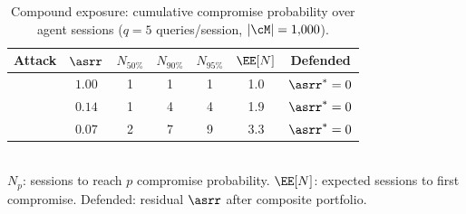 \begin{table}[t]
  \centering
  \small
  \caption{Compound exposure: cumulative compromise probability over agent sessions ($q = 5$ queries/session, $|\cM| = 1{,}000$).}
  \label{tab:compound_exposure}
  \vspace{2pt}
  \begin{tabular}{l c cccc c}
    \toprule
    Attack & $\asrr$ & $N_{50\%}$ & $N_{90\%}$ & $N_{95\%}$ & $\EE[N]$ & Defended \\
    \midrule
    \agentpoison{} & $1.00$ & 1 & 1 & 1 & 1.0 & $\asrr^* = 0$ \\
    \minja{} & $0.14$ & 1 & 4 & 4 & 1.9 & $\asrr^* = 0$ \\
    \injecmem{} & $0.07$ & 2 & 7 & 9 & 3.3 & $\asrr^* = 0$ \\
    \bottomrule
  \end{tabular}
  \\[2pt]
  {\footnotesize $N_{p}$: sessions to reach $p$ compromise probability. $\EE[N]$: expected sessions to first compromise. Defended: residual $\asrr$ after composite portfolio.}
  \vspace{-6pt}
\end{table}
